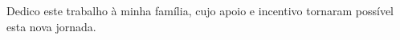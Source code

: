 \begin{dedicatoria}
	\vspace*{\fill}
    
    \center
    \begin{flushright}
    	Dedico este trabalho à minha família, cujo apoio e incentivo tornaram possível esta nova jornada.
    \end{flushright}
    
\end{dedicatoria}